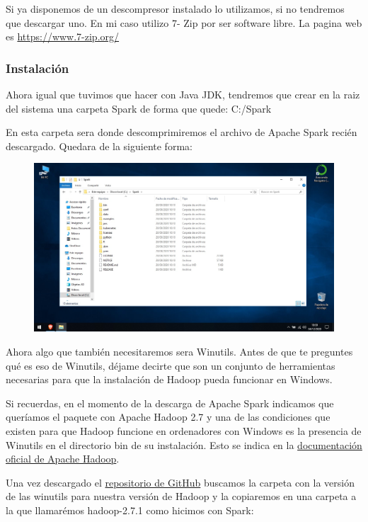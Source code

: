\documentclass[a4paper,10pt]{article}
\begin{document}
Si ya disponemos de un descompresor instalado lo utilizamos, si no tendremos que descargar uno. En mi caso utilizo 7- Zip por ser software libre. La pagina web es \href{https://www.7-zip.org/}{https://www.7-zip.org/}    

\subsubsection{Instalación}

Ahora igual que tuvimos que hacer con Java JDK, tendremos que crear en la raiz del sistema una carpeta Spark de forma que quede: C:/Spark 

En esta carpeta sera donde descomprimiremos el archivo de Apache Spark recién descargado. Quedara de la siguiente forma: 

\begin{figure}[H]
\begin{center}
\includegraphics[width=500pt]{./fotos/introduccion/16 - Spark.jpg}
\end{center}
\end{figure}

Ahora algo que también necesitaremos sera Winutils. Antes de que te preguntes qué es eso de Winutils, déjame decirte que son un conjunto de herramientas necesarias para que la instalación de Hadoop pueda funcionar en Windows. 

Si recuerdas, en el momento de la descarga de Apache Spark indicamos que queríamos el paquete con Apache Hadoop 2.7 y una de las condiciones que existen para que Hadoop funcione en ordenadores con Windows es la presencia de Winutils en el directorio bin de su instalación. Esto se indica en la \href{https://cwiki.apache.org/confluence/display/HADOOP2/WindowsProblems}{documentación oficial de Apache Hadoop}.

Una vez descargado el \href{https://github.com/steveloughran/winutils}{repositorio de GitHub} buscamos la carpeta con la versión de las winutils para nuestra versión de Hadoop  y la copiaremos en una carpeta a la que llamarémos hadoop-2.7.1 como hicimos con Spark:
\end{document}

